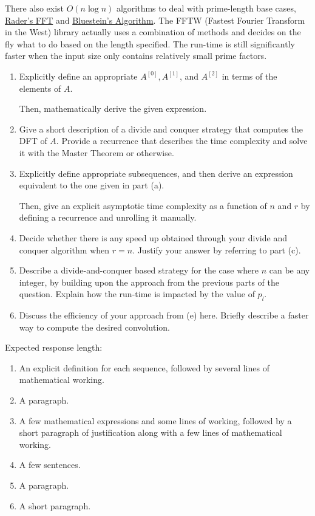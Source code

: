 \documentclass[12pt]{article}
\begin{document}
\begin{question}
There also exist $O(n\log n)$ algorithms to deal with prime-length base cases, \href{https://en.wikipedia.org/wiki/Rader%27s_FFT_algorithm}{Rader's FFT} and \href{https://en.wikipedia.org/wiki/Chirp_Z-transform#Bluestein.27s_algorithm}{Bluestein's Algorithm}. The FFTW (Fastest Fourier Transform in the West) library actually uses a combination of methods and decides on the fly what to do based on the length specified. The run-time is still significantly faster when the input size only contains relatively small prime factors.
\end{question}

\begin{rubric}

\begin{enumerate}
    \item Explicitly define an appropriate $A^{[0]}, A^{[1]}$, and $A^{[2]}$ in terms of the elements of $A$.
    
    Then, mathematically derive the given expression.
    \item Give a short description of a divide and conquer strategy that computes the DFT of $A$. Provide a recurrence that describes the time complexity and solve it with the Master Theorem or otherwise.
    \item Explicitly define appropriate subsequences, and then derive an expression equivalent to the one given in part (a).
    
    Then, give an explicit asymptotic time complexity as a function of $n$ and $r$ by defining a recurrence and unrolling it manually.
    \item Decide whether there is any speed up obtained through your divide and conquer algorithm when $r = n$. Justify your answer by referring to part (c).
    \item Describe a divide-and-conquer based strategy for the case where $n$ can be any integer, by building upon the approach from the previous parts of the question. Explain how the run-time is impacted by the value of $p_l$.
    \item \label{zero-pad} Discuss the efficiency of your approach from (e) here. Briefly describe a faster way to compute the desired convolution.
\end{enumerate}

Expected response length:
\begin{enumerate}
    \item An explicit definition for each sequence, followed by several lines of mathematical working.
    \item A paragraph.
    \item A few mathematical expressions and some lines of working, followed by a short paragraph of justification along with a few lines of mathematical working.
    \item A few sentences.
    \item A paragraph.
    \item A short paragraph.
\end{enumerate}
\end{rubric}

\begin{solution}
\end{solution}

\begin{attribution}
\end{attribution}
\end{document}
